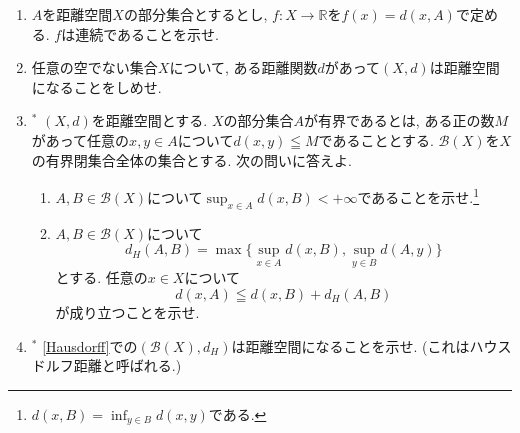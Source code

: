 \documentclass[dvipdfmx,a4paper,11pt]{article}
\newcommand{\R}{\mathbb{R}}
\theoremstyle{definition}
\begin{document}
\begin{enumerate}[label=\textbf{問}1.\arabic*]

  \item $A$を距離空間$X$の部分集合とするとし, $f : X \rightarrow \R$を$f(x) =d(x,A)$で定める. $f$は連続であることを示せ.
  
  
  \item 任意の空でない集合$X$について, ある距離関数$d$があって$(X,d)$は距離空間になることをしめせ.
  
    \item $^{*}$\label{Hausdorff} $(X,d)$を距離空間とする. $X$の部分集合$A$が有界であるとは, ある正の数$M$があって任意の$x, y \in A$について$d(x,y) \leqq M$であることとする. $\mathcal{B}(X)$を$X$の有界閉集合全体の集合とする. 次の問いに答えよ.
    \begin{enumerate}
    	\item $A,B \in \mathcal{B}(X)$について$\sup_{x \in A}d(x,B) < + \infty$であることを示せ.\footnote{$d(x,B) = \inf_{y \in B} d(x,y)$である.}
	\item $A,B \in \mathcal{B}(X)$について
	$$
	d_{H}(A,B) = \max \{ \sup_{x \in A}d(x,B), \sup_{y  \in B}d(A,y)\}
	$$
	とする. 任意の$x \in X$について
	$$
	d(x,A) \leqq d(x,B) + d_{H}(A,B) 
	$$
	が成り立つことを示せ. 
    \end{enumerate}
\item $^{*}$ \ref{Hausdorff}での$(\mathcal{B}(X), d_{H})$は距離空間になることを示せ. (これはハウスドルフ距離と呼ばれる.)
 \end{enumerate}
\end{document}
